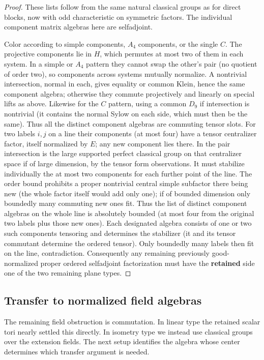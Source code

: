 \begin{proof}
These lists follow from the same natural classical groups as for direct blocks, now with odd characteristic on symmetric factors. The individual component matrix algebras here are selfadjoint.

Color according to simple components, \(A_4\) components, or the single \(C\). The projective components lie in \(H\), which permutes at most two of them in each system. In a simple or \(A_4\) pattern they cannot swap the other's pair (no quotient of order two), so components across systems mutually normalize. A nontrivial intersection, normal in each, gives equality or common Klein, hence the same component algebra; otherwise they commute projectively and linearly on special lifts as above. Likewise for the \(C\) pattern, using a common \(D_9\) if intersection is nontrivial (it contains the normal Sylow on each side, which must then be the same). Thus all the distinct component algebras are commuting tensor slots. For two labels \(i,j\) on a line their components (at most four) have a tensor centralizer factor, itself normalized by \(E\); any new component lies there. In the pair intersection is the large supported perfect classical group on that centralizer space if of large dimension, by the tensor form observations. It must stabilize individually the at most two components for each further point of the line. The order bound prohibits a proper nontrivial central simple subfactor there being new (the whole factor itself would add only one); if of bounded dimension only boundedly many commuting new ones fit. Thus the list of distinct component algebras on the whole line is absolutely bounded (at most four from the original two labels plus those new ones). Each designated algebra consists of one or two such components tensoring and determines the stabilizer (it and its tensor commutant determine the ordered tensor). Only boundedly many labels then fit on the line, contradiction. Consequently any remaining previously good-normalized proper ordered selfadjoint factorization must have the \textbf{retained} side one of the two remaining plane types.
\end{proof}

\subsection{Transfer to normalized field algebras}

The remaining field obstruction is commutation. In linear type the
retained scalar tori nearly settled this directly. In isometry type
we instead use classical groups over the extension fields. The next
setup identifies the algebra whose center determines which transfer
argument is needed.

